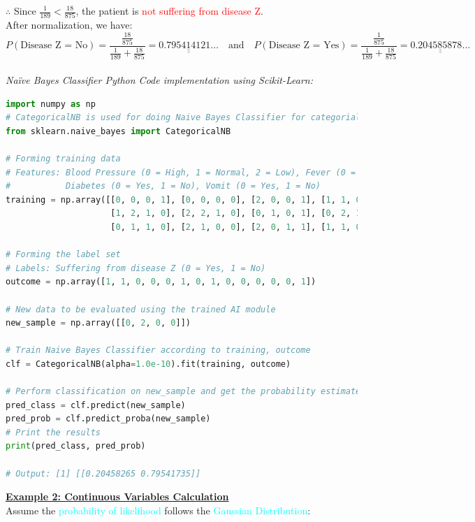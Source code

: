 \documentclass{book}
\begin{document}
$\therefore$ Since \(\frac{1}{189} < \frac{18}{875}\), the patient is \textcolor{red}{not suffering from disease Z}.\\
After normalization, we have:
\[
    P(\text{Disease Z = No}) = \frac{\frac{18}{875}}{\frac{1}{189} + \frac{18}{875}} = \underline{\underline{0.795414121\ldots}} \quad \text{and} \quad P(\text{Disease Z = Yes}) = \frac{\frac{1}{875}}{\frac{1}{189} + \frac{18}{875}} = \underline{\underline{0.204585878\ldots}}
\]\\
\newpage
\textit{\large{Naïve Bayes Classifier Python Code implementation using Scikit-Learn:}}
\begin{lstlisting}[language=Python, basicstyle=\ttfamily\small, keywordstyle=\color{blue}, commentstyle=\color{forestgreen}, stringstyle=\color{red}]
import numpy as np
# CategoricalNB is used for doing Naive Bayes Classifier for categorial features
from sklearn.naive_bayes import CategoricalNB

# Forming training data
# Features: Blood Pressure (0 = High, 1 = Normal, 2 = Low), Fever (0 = High, 1 = Mild, 2 = No Fever), 
#           Diabetes (0 = Yes, 1 = No), Vomit (0 = Yes, 1 = No)
training = np.array([[0, 0, 0, 1], [0, 0, 0, 0], [2, 0, 0, 1], [1, 1, 0, 1], [1, 2, 1, 1], 
                     [1, 2, 1, 0], [2, 2, 1, 0], [0, 1, 0, 1], [0, 2, 1, 1], [1, 1, 1, 1], 
                     [0, 1, 1, 0], [2, 1, 0, 0], [2, 0, 1, 1], [1, 1, 0, 0]])

# Forming the label set
# Labels: Suffering from disease Z (0 = Yes, 1 = No)
outcome = np.array([1, 1, 0, 0, 0, 1, 0, 1, 0, 0, 0, 0, 0, 1])

# New data to be evaluated using the trained AI module
new_sample = np.array([[0, 2, 0, 0]])

# Train Naive Bayes Classifier according to training, outcome
clf = CategoricalNB(alpha=1.0e-10).fit(training, outcome)

# Perform classification on new_sample and get the probability estimated
pred_class = clf.predict(new_sample)
pred_prob = clf.predict_proba(new_sample)
# Print the results
print(pred_class, pred_prob)

# Output: [1] [[0.20458265 0.79541735]]
\end{lstlisting}
\newpage
\underline{\textbf{Example 2: Continuous Variables Calculation}}\\
Assume the \textcolor{cyan}{probability of likelihood} follows the \textcolor{cyan}{Gaussian Distribution}:
\end{document}
